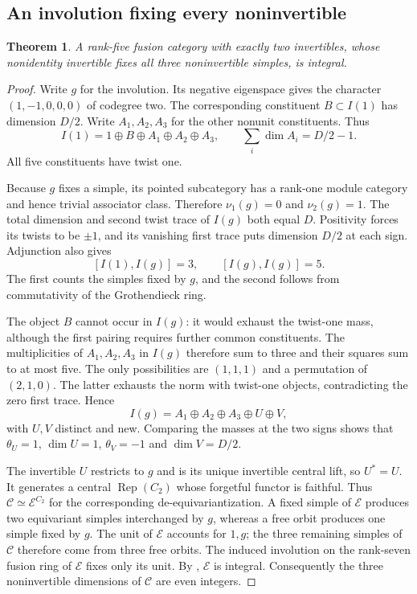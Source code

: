 \documentclass[11pt,a4paper]{article}
\newtheorem{theorem}{Theorem}[section]
\numberwithin{equation}{section}
\begin{document}
\subsection{An involution fixing every noninvertible}
\begin{theorem}\label{thm:fixed-inv-two-classification}
A rank-five fusion category with exactly two invertibles, whose
nonidentity invertible fixes all three noninvertible simples, is integral.
\end{theorem}
\begin{proof}
Write $g$ for the involution. Its negative eigenspace gives the
character $(1,-1,0,0,0)$ of codegree two. The corresponding constituent
$B\subset I(1)$ has dimension $D/2$. Write $A_1,A_2,A_3$ for the
other nonunit constituents. Thus
\[
 I(1)=1\oplus B\oplus A_1\oplus A_2\oplus A_3,
 \qquad \sum_i\dim A_i=D/2-1.
\]
All five constituents have twist one.

Because $g$ fixes a simple, its pointed subcategory has a rank-one
module category and hence trivial associator class. Therefore
$\nu_1(g)=0$ and $\nu_2(g)=1$. The total dimension and second twist
trace of $I(g)$ both equal $D$. Positivity forces its twists to be
$\pm1$, and its vanishing first trace puts dimension $D/2$ at each sign.
Adjunction also gives
\[
 [I(1),I(g)]=3,\qquad [I(g),I(g)]=5.
\]
The first counts the simples fixed by $g$, and the second follows
from commutativity of the Grothendieck ring.

The object $B$ cannot occur in $I(g)$: it would exhaust the twist-one
mass, although the first pairing requires further common constituents.
The multiplicities of $A_1,A_2,A_3$ in $I(g)$ therefore sum to three
and their squares sum to at most five. The only possibilities are
$(1,1,1)$ and a permutation of $(2,1,0)$. The latter exhausts the
norm with twist-one objects, contradicting the zero first trace.
Hence
\[
 I(g)=A_1\oplus A_2\oplus A_3\oplus U\oplus V,
\]
with $U,V$ distinct and new. Comparing the masses at the two signs
shows that $\theta_U=1$, $\dim U=1$, $\theta_V=-1$ and
$\dim V=D/2$.

The invertible $U$ restricts to $g$ and is its unique invertible
central lift, so $U^*=U$. It generates a central
$\operatorname{Rep}(C_2)$ whose forgetful functor is faithful.
Thus $\mathcal C\simeq\mathcal E^{C_2}$ for the corresponding
de-equivariantization. A fixed simple of $\mathcal E$ produces two
equivariant simples interchanged by $g$, whereas a free orbit produces
one simple fixed by $g$. The unit of $\mathcal E$ accounts for $1,g$;
the three remaining simples of $\mathcal C$ therefore come from three
free orbits. The induced involution on the rank-seven fusion ring
of $\mathcal E$ fixes only its unit. By
\cite[Theorem~2.3(1)]{SchFixed}, $\mathcal E$ is integral.
Consequently the three noninvertible dimensions of $\mathcal C$
are even integers.
\end{proof}
\end{document}
